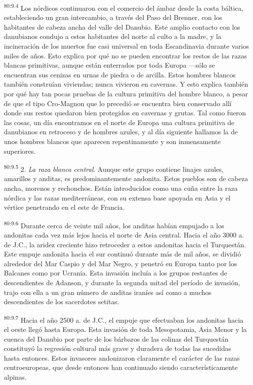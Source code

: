 \par
\textsuperscript{80:9.4} Los nórdicos continuaron con el comercio del ámbar desde la costa báltica, estableciendo un gran intercambio, a través del Paso del Brenner, con los habitantes de cabeza ancha del valle del Danubio. Este amplio contacto con los danubianos condujo a estos habitantes del norte al culto a la madre, y la incineración de los muertos fue casi universal en toda Escandinavia durante varios miles de años. Esto explica por qué no se pueden encontrar los restos de las razas blancas primitivas, aunque están enterrados por toda Europa ---sólo se encuentran sus cenizas en urnas de piedra o de arcilla. Estos hombres blancos también construían viviendas; nunca vivieron en cavernas. Y esto explica también por qué hay tan pocas pruebas de la cultura primitiva del hombre blanco, a pesar de que el tipo Cro-Magnon que lo precedió se encuentra bien conservado allí donde sus restos quedaron bien protegidos en cavernas y grutas. Tal como fueron las cosas, un día encontramos en el norte de Europa una cultura primitiva de danubianos en retroceso y de hombres azules, y al día siguiente hallamos la de unos hombres blancos que aparecen repentinamente y son inmensamente superiores.

\par
\textsuperscript{80:9.5} 2. \textit{La raza blanca central}. Aunque este grupo contiene linajes azules, amarillos y anditas, es predominantemente andonita. Estos pueblos son de cabeza ancha, morenos y rechonchos. Están introducidos como una cuña entre la raza nórdica y las razas mediterráneas, con su extensa base apoyada en Asia y el vértice penetrando en el este de Francia.

\par
\textsuperscript{80:9.6} Durante cerca de veinte mil años, los anditas habían empujado a los andonitas cada vez más lejos hacia el norte de Asia central. Hacia el año 3000 a. de J.C., la aridez creciente hizo retroceder a estos andonitas hacia el Turquestán. Este empuje andonita hacia el sur continuó durante más de mil años, se dividió alrededor del Mar Caspio y del Mar Negro, y penetró en Europa tanto por los Balcanes como por Ucrania. Esta invasión incluía a los grupos restantes de descendientes de Adanson, y durante la segunda mitad del período de invasión, trajo con ella a un gran número de anditas iraníes así como a muchos descendientes de los sacerdotes setitas.

\par
\textsuperscript{80:9.7} Hacia el año 2500 a. de J.C., el empuje que efectuaban los andonitas hacia el oeste llegó hasta Europa. Esta invasión de toda Mesopotamia, Asia Menor y la cuenca del Danubio por parte de los bárbaros de las colinas del Turquestán constituyó la regresión cultural más grave y duradera de todas las sucedidas hasta entonces. Estos invasores andonizaron claramente el carácter de las razas centroeuropeas, que desde entonces han continuado siendo característicamente alpinas.


